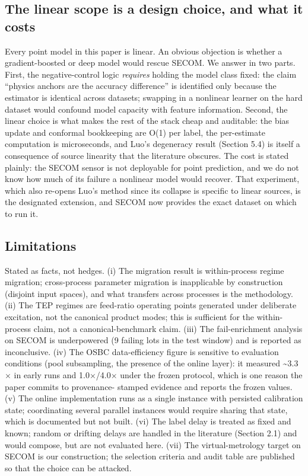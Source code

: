 \subsection{The linear scope is a design choice, and what it costs}

Every point model in this paper is linear. An obvious objection is whether a
gradient-boosted or deep model would rescue SECOM. We answer in two parts. First, the
negative-control logic \emph{requires} holding the model class fixed: the claim ``physics
anchors are the accuracy difference'' is identified only because the estimator is
identical across datasets; swapping in a nonlinear learner on the hard dataset would
confound model capacity with feature information. Second, the linear choice is what
makes the rest of the stack cheap and auditable: the bias update and conformal
bookkeeping are O(1) per label, the per-estimate computation is microseconds, and Luo's
degeneracy result (Section 5.4) is itself a consequence of source linearity that the
literature obscures. The cost is stated plainly: the SECOM sensor is not deployable
for point prediction, and we do not know how much of its failure a nonlinear model
would recover. That experiment, which also re-opens Luo's method since its collapse
is specific to linear sources, is the designated extension, and SECOM now provides
the exact dataset on which to run it.

\subsection{Limitations}

Stated as facts, not hedges. (i) The migration result is within-process regime
migration; cross-process parameter migration is inapplicable by construction
(disjoint input spaces), and what transfers across processes is the methodology.
(ii) The TEP regimes are feed-ratio operating points generated under deliberate
excitation, not the canonical product modes; this is sufficient for the within-process claim,
not a canonical-benchmark claim. (iii) The fail-enrichment analysis on SECOM is
underpowered (9 failing lots in the test window) and is reported as inconclusive.
(iv) The OSBC data-efficiency figure is sensitive to evaluation conditions (pool
subsampling, the presence of the online layer): it measured \textasciitilde3.3$\times$ in early runs and
1.0$\times$/4.0$\times$ under the frozen protocol, which is one reason the paper commits to provenance-
stamped evidence and reports the frozen values. (v) The online implementation runs as a single instance with persisted calibration state; coordinating several parallel instances would require sharing that state, which is documented but not built. (vi) The label delay is treated as fixed and
known; random or drifting delays are handled in the literature (Section 2.1) and
would compose, but are not evaluated here. (vii) The virtual-metrology target on SECOM
is our construction; the selection criteria and audit table are published so
that the choice can be attacked.


